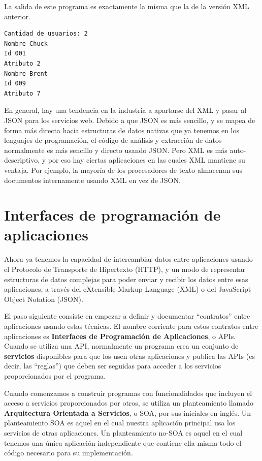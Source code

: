 La salida de este programa es exactamente la misma que la de la versión XML anterior.

\beforeverb
\begin{verbatim}
Cantidad de usuarios: 2
Nombre Chuck
Id 001
Atributo 2
Nombre Brent
Id 009
Atributo 7
\end{verbatim}
\afterverb
%
En general, hay una tendencia en la industria a apartarse del XML y pasar al JSON para
los servicios web. Debido a que JSON es más sencillo, y se mapea de forma más directa hacia
estructuras de datos nativas que ya tenemos en los lenguajes de programación, el código de
análisis y extracción de datos normalmente es más sencillo y directo usando JSON.
Pero XML es más auto-descriptivo, y por eso hay ciertas
aplicaciones en las cuales XML mantiene su ventaja. Por ejemplo, la mayoría de los
procesadores de texto almacenan sus documentos internamente usando XML en vez de JSON.

\section{Interfaces de programación de aplicaciones}

Ahora ya tenemos la capacidad de intercambiar datos entre aplicaciones usando el Protocolo
de Transporte de Hipertexto (HTTP), y un modo de representar estructuras de datos complejas
para poder enviar y recibir los datos entre esas aplicaciones, a través del eXtensible 
Markup Language (XML) o del JavaScript Object Notation (JSON).

El paso siguiente consiste en empezar a definir y documentar ``contratos'' entre
aplicaciones usando estas técnicas. El nombre corriente para estos
contratos entre aplicaciones es {\bf Interfaces de Programación
de Aplicaciones}, o APIs. Cuando se utiliza una API, normalmente un programa
crea un conjunto de {\bf servicios} disponibles para que los usen otras aplicaciones
y publica las APIs (es decir, las ``reglas'') que deben ser seguidas para
acceder a los servicios proporcionados por el programa.

Cuando comenzamos a construir programas con funcionalidades que incluyen
el acceso a servicios proporcionados por otros,
se utiliza un planteamiento llamado {\bf Arquitectura Orientada a Servicios}, o SOA, por sus
iniciales en inglés.
Un planteamiento SOA es aquel en el cual nuestra aplicación principal usa los servicios
de otras aplicaciones. Un planteamiento no-SOA es aquel en el cual tenemos
una única aplicación independiente que contiene ella misma todo el código
necesario para su implementación.

